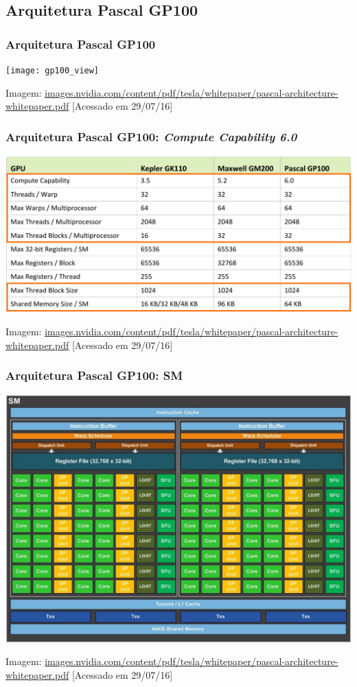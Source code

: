 \documentclass[10pt, compress]{beamer}
\begin{document}
\subsection{Arquitetura Pascal GP100}

\begin{frame}
    \frametitle{Arquitetura Pascal GP100}
    \centering
    \texttt{[image: gp100\_view]}
    \vfill

    \tiny{Imagem: \url{images.nvidia.com/content/pdf/tesla/whitepaper/pascal-architecture-whitepaper.pdf} [Acessado em 29/07/16]}
\end{frame}

\begin{frame}
    \frametitle{Arquitetura Pascal GP100: \textit{Compute Capability 6.0}}
    \centering
    \includegraphics[width=\textwidth]{cc_6_highlight}
    \vfill

    \tiny{Imagem: \url{images.nvidia.com/content/pdf/tesla/whitepaper/pascal-architecture-whitepaper.pdf} [Acessado em 29/07/16]}
\end{frame}

\begin{frame}
    \frametitle{Arquitetura Pascal GP100: SM}
    \centering
    \includegraphics[width=.9\textwidth]{gp100_SM_diagram}
    \vfill

    \tiny{Imagem: \url{images.nvidia.com/content/pdf/tesla/whitepaper/pascal-architecture-whitepaper.pdf} [Acessado em 29/07/16]}
\end{frame}
\end{document}

